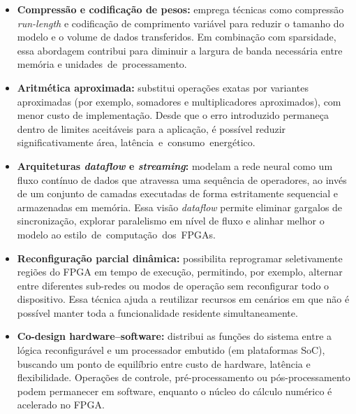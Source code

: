 \begin{itemize}
	\item \textbf{Compressão e codificação de pesos:} emprega técnicas como compressão \textit{run-length} e codificação de comprimento variável para reduzir o tamanho do modelo e o volume de dados transferidos. Em combinação com sparsidade, essa abordagem contribui para diminuir a largura de banda necessária entre memória e \mbox{unidades de processamento.}
	
	\item \textbf{Aritmética aproximada:} substitui operações exatas por variantes aproximadas (por exemplo, somadores e multiplicadores aproximados), com menor custo de implementação. Desde que o erro introduzido permaneça dentro de limites aceitáveis para a aplicação, é possível reduzir significativamente área, \mbox{latência e consumo energético.}
	
	\item \textbf{Arquiteturas \textit{dataflow} e \textit{streaming}:} modelam a rede neural como um fluxo contínuo de dados que atravessa uma sequência de operadores, ao invés de um conjunto de camadas executadas de forma estritamente sequencial e armazenadas em memória. Essa visão \textit{dataflow} permite eliminar gargalos de sincronização, explorar paralelismo em nível de fluxo e alinhar melhor o modelo ao \mbox{estilo de computação dos FPGAs.}
	
	\item \textbf{Reconfiguração parcial dinâmica:} possibilita reprogramar seletivamente regiões do FPGA em tempo de execução, permitindo, por exemplo, alternar entre diferentes sub-redes ou modos de operação sem reconfigurar todo o dispositivo. Essa técnica ajuda a reutilizar recursos em cenários em que não é possível manter toda a funcionalidade residente simultaneamente.
	
	\item \textbf{Co-design hardware--software:} distribui as funções do sistema entre a lógica reconfigurável e um processador embutido (em plataformas SoC), buscando um ponto de equilíbrio entre custo de hardware, latência e flexibilidade. Operações de controle, pré-processamento ou pós-processamento podem permanecer em software, enquanto o núcleo do cálculo numérico é acelerado no FPGA.
\end{itemize}


